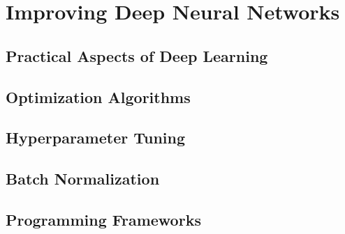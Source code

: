 \chapter{Improving Deep Neural Networks}
\section{Practical Aspects of Deep Learning}
\section{Optimization Algorithms}
\section{Hyperparameter Tuning}
\section{Batch Normalization}
\section{Programming Frameworks}